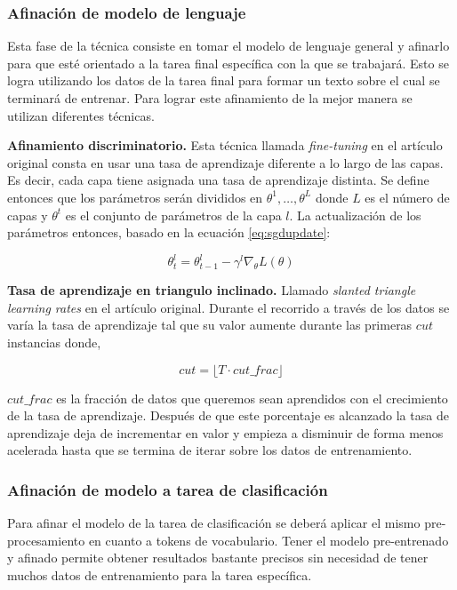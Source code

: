 \subsubsection{Afinación de modelo de lenguaje}
\label{lmftune}

Esta fase de la técnica consiste en tomar el modelo de lenguaje general y afinarlo para que esté orientado a la tarea final específica con la que se trabajará. Esto se logra utilizando los datos de la tarea final para formar un texto sobre el cual se terminará de entrenar. Para lograr este afinamiento de la mejor manera se utilizan diferentes técnicas.

\textbf{Afinamiento discriminatorio.} Esta técnica llamada \textit{fine-tuning} en el artículo original consta en usar una tasa de aprendizaje diferente a lo largo de las capas. Es decir, cada capa tiene asignada una tasa de aprendizaje distinta. Se define entonces que los parámetros serán divididos en ${\theta^1, \ldots, \theta^L}$ donde $L$ es el número de capas y $\theta^t$ es el conjunto de parámetros de la capa $l$. La actualización de los parámetros entonces, basado en la ecuación \ref{eq:sgdupdate}:

\begin{equation}
\label{eq:discupdate}
\theta_t^l = \theta_{t-1}^l - \gamma^l \nabla_{\theta} L(\theta)
\end{equation}

\textbf{Tasa de aprendizaje en triangulo inclinado.} Llamado \emph{slanted triangle learning rates} en el artículo original. Durante el recorrido a través de los datos se varía la tasa de aprendizaje tal que su valor aumente durante las primeras $cut$ instancias donde,

$$ cut = \lfloor T \cdot cut\_frac \rfloor$$

$cut\_frac$ es la fracción de datos que queremos sean aprendidos con el crecimiento de la tasa de aprendizaje. Después de que este porcentaje es alcanzado la tasa de aprendizaje deja de incrementar en valor y empieza a disminuir de forma menos acelerada hasta que se termina de iterar sobre los datos de entrenamiento.

\subsubsection{Afinación de modelo a tarea de clasificación}

Para afinar el modelo de la tarea de clasificación se deberá aplicar el mismo pre-procesamiento en cuanto a tokens de vocabulario. Tener el modelo pre-entrenado y afinado permite obtener resultados bastante precisos sin necesidad de tener muchos datos de entrenamiento para la tarea específica.

